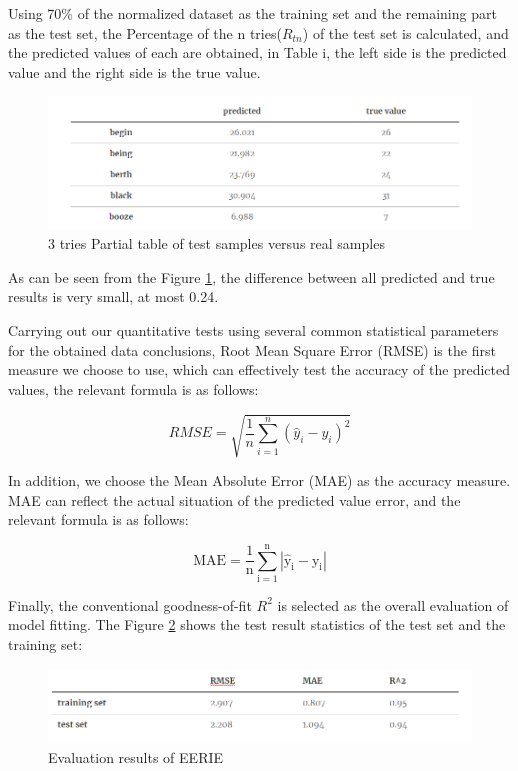 \documentclass[a4paper]{jpconf}
\begin{document}
Using 70\% of the normalized dataset as the training set and the remaining part as the test set, the Percentage of the n tries($R_{tn}$) of the test set is calculated, and the predicted values of each are obtained, in Table i, the left side is the predicted value and the right side is the true value.

\begin{figure}[htbp]
\centering
\includegraphics[width=.7\textwidth]{img/image.png}
\caption{\label{fig:image}3 tries Partial table of test samples versus real samples}
\end{figure}

As can be seen from the Figure \ref{fig:image}, the difference between all predicted and true results is very small, at most 0.24.

Carrying out our quantitative tests using several common statistical parameters for the obtained data conclusions, Root Mean Square Error (RMSE) is the first measure we choose to use, which can effectively test the accuracy of the predicted values, the relevant formula is as follows:

\begin{equation}\label{eq:RMSE}
R M S E=\sqrt{\frac{1}{n} \sum_{i=1}^{n}\left(\hat{y}_{i}-y_{i}\right)^{2}}
\end{equation}

In addition, we choose the Mean Absolute Error (MAE) as the accuracy measure. MAE can reflect the actual situation of the predicted value error, and the relevant formula is as follows:

\begin{equation}\label{eq:MAE}
\mathrm{MAE}=\frac{1}{\mathrm{n}} \sum_{\mathrm{i}=1}^{\mathrm{n}}\left|\hat{\mathrm{y}}_{\mathrm{i}}-\mathrm{y}_{\mathrm{i}}\right|
\end{equation}

Finally, the conventional goodness-of-fit $R^2$ is selected as the overall evaluation of model fitting. The Figure \ref{fig:compare} shows the test result statistics of the test set and the training set:

\begin{figure}[htbp]
\centering
\includegraphics[width=.8\textwidth]{img/compare.png}
\caption{Evaluation results of EERIE}\label{fig:compare}
\end{figure}
\end{document}
